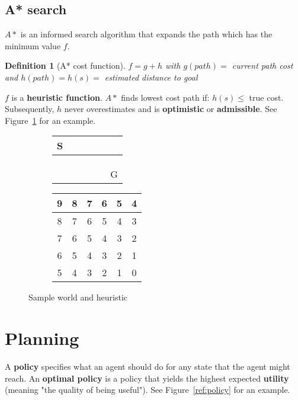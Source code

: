 \documentclass{report}
\newtheorem{definition}{Definition}[section]
\begin{document}
\section{A* search}
$A*$ is an informed search algorithm that expands the path which has the minimum value $f$.

\begin{definition}[A* cost function]
$f = g + h$ with $g(path) =$ current path cost and $h(path) = h(s) =$ estimated distance to goal
\end{definition}

$f$ is a {\bf heuristic function}. $A*$ finds lowest cost path if: $h(s) \le $ true cost. Subsequently, $h$ never overestimates and is {\bf optimistic} or {\bf admissible}. See Figure~\ref{ref:heuristic} for an example.

\begin{figure}[h!]
\centering
\begin{subfigure}[b]{0.3\textwidth}
\begin{tabular}{|c|c|c|c|c|c|}
\hline
S &\cellcolor{black}&&&& \\
\hline
&\cellcolor{black}&&&& \\
\hline
&\cellcolor{black}&&&& \\
\hline
&\cellcolor{black}&&&& \\
\hline
&&&&&G \\
\hline
\end{tabular}
\end{subfigure}
\begin{subfigure}[b]{0.3\textwidth}
\begin{tabular}{|c|c|c|c|c|c|}
\hline
9&8&7&6&5&4 \\
\hline
8&7&6&5&4&3 \\
\hline
7&6&5&4&3&2 \\
\hline
6&5&4&3&2&1 \\
\hline
5&4&3&2&1&0 \\
\hline
\end{tabular}
\end{subfigure}
\caption{Sample world and heuristic}
\label{ref:heuristic}
\end{figure}



\chapter{Planning}
\label{ref:chapterplanning}
A {\bf policy} specifies what an agent should do for any state that the agent might reach. An {\bf optimal policy} is a policy that yields the highest expected {\bf utility} (meaning "the quality of being useful"). See Figure~\ref{ref:policy} for an example.
\end{document}
